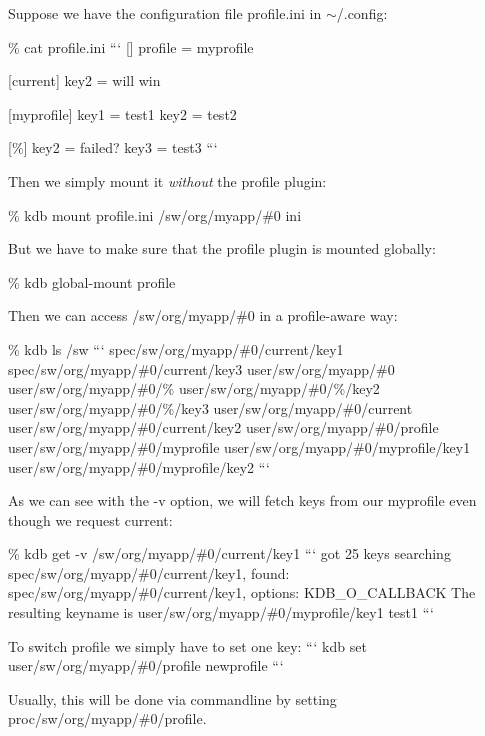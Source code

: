 Suppose we have the configuration file profile.\+ini in $\sim$/.config\+:

\% cat profile.\+ini ``` \mbox{[}\mbox{]} profile = myprofile

\mbox{[}current\mbox{]} key2 = will win

\mbox{[}myprofile\mbox{]} key1 = test1 key2 = test2

\mbox{[}\%\mbox{]} key2 = failed? key3 = test3 ```

Then we simply mount it {\itshape without} the profile plugin\+:

\% kdb mount profile.\+ini /sw/org/myapp/\#0 ini

But we have to make sure that the profile plugin is mounted globally\+:

\% kdb global-\/mount profile

Then we can access /sw/org/myapp/\#0 in a profile-\/aware way\+:

\% kdb ls /sw ``` spec/sw/org/myapp/\#0/current/key1 spec/sw/org/myapp/\#0/current/key3 user/sw/org/myapp/\#0 user/sw/org/myapp/\#0/\% user/sw/org/myapp/\#0/\%/key2 user/sw/org/myapp/\#0/\%/key3 user/sw/org/myapp/\#0/current user/sw/org/myapp/\#0/current/key2 user/sw/org/myapp/\#0/profile user/sw/org/myapp/\#0/myprofile user/sw/org/myapp/\#0/myprofile/key1 user/sw/org/myapp/\#0/myprofile/key2 ```

As we can see with the {\ttfamily -\/v} option, we will fetch keys from our {\ttfamily myprofile} even though we request {\ttfamily current}\+:

\% kdb get -\/v /sw/org/myapp/\#0/current/key1 ``` got 25 keys searching spec/sw/org/myapp/\#0/current/key1, found\+: spec/sw/org/myapp/\#0/current/key1, options\+: K\+D\+B\+\_\+\+O\+\_\+\+C\+A\+L\+L\+B\+A\+C\+K The resulting keyname is user/sw/org/myapp/\#0/myprofile/key1 test1 ```

To switch profile we simply have to set one key\+: ``` kdb set user/sw/org/myapp/\#0/profile newprofile ```

Usually, this will be done via commandline by setting {\ttfamily proc/sw/org/myapp/\#0/profile}. 